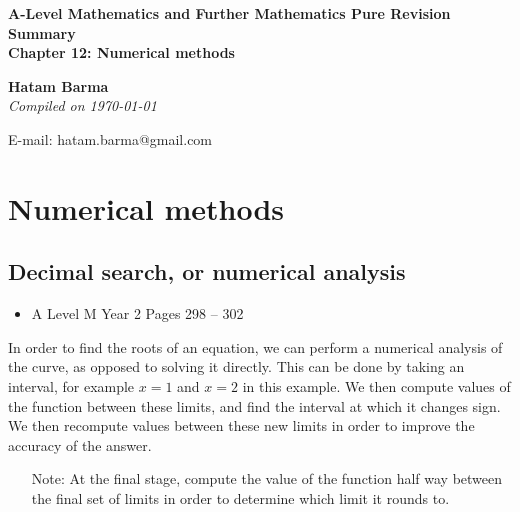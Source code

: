\documentclass[11pt, a4paper]{article}
\begin{document}
\begin{titlepage}
   \begin{center}
       \vspace*{2.5cm}
	\huge
       \textbf{A-Level Mathematics and Further Mathematics Pure Revision Summary} \\
	\vspace{1cm}
	\Large
       \textbf{Chapter 12: Numerical methods}
            
       \vspace{1.5cm}
	\LARGE
       \textbf{Hatam Barma} \\
	\vspace{0.75cm}
       \normalsize
       \emph{Compiled on \Datea\today} \\

       \vfill
        

	E-mail: hatam.barma@gmail.com
   \end{center}
\end{titlepage}


\tableofcontents

\clearpage
\section{Numerical methods}
\vspace{0.5cm}


\subsection{Decimal search, or numerical analysis}
\begin{itemize}
\item A Level M Year 2 \hspace{1cm} \phantom{ AS / } Pages 298 -- 302
\end{itemize} \par
In order to find the roots of an equation,  we can perform a numerical analysis of the curve, as opposed to solving it directly. This can be done by taking an interval, for example $x=1$ and $x=2$ in this example. We then compute values of the function between these limits, and find the interval at which it changes sign. We then recompute values between these new limits in order to improve the accuracy of the answer.
\begin{itemize}
\item[Note:] At the final stage, compute the value of the function half way between the final set of limits in order to determine which limit it rounds to.
\end{itemize}
\vspace{0.5cm}
\end{document}

